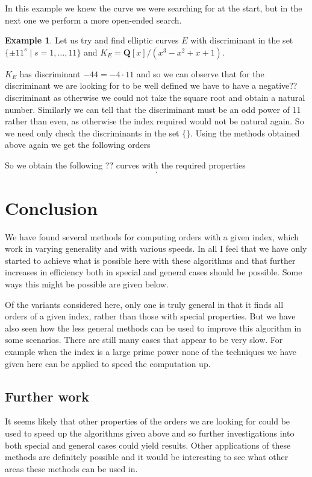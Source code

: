 \documentclass[12pt,a4paper,abstracton,bibtotoc]{scrreprt}
\theoremstyle{definition}
\newtheorem{ex}{Example}
\newcommand{\QQ}{\mathbf{Q}}
\begin{document}
In this example we knew the curve we were searching for at the start, but in the next one we perform a more open-ended search.

\begin{ex}
Let us try and find elliptic curves $E$ with discriminant in the set $\{\pm 11^s\mid s = 1,\ldots,11\}$ and $K_E = \QQ[x]/(x^3 - x^2 + x + 1)$.

$K_E$ has discriminant $-44 = -4\cdot 11$ and so we can observe that for the discriminant we are looking for to be well defined we have to have a negative?? discriminant as otherwise we could not take the square root and obtain a natural number.
Similarly we can tell that the discriminant must be an odd power of 11 rather than even, as otherwise the index required would not be natural again.
So we need only check the discriminants in the set $\{\}$.
Using the methods obtained above again we get the following orders

So we obtain the following ?? curves with the required properties
\[
.
\]
\end{ex}

\chapter{Conclusion}
We have found several methods for computing orders with a given index, which work in varying generality and with various speeds.
In all I feel that we have only started to achieve what is possible here with these algorithms and that further increases in efficiency both in special and general cases should be possible.
Some ways this might be possible are given below.

Of the variants considered here, only one is truly general in that it finds all orders of a given index, rather than those with special properties.
But we have also seen how the less general methods can be used to improve this algorithm in some scenarios.
There are still many cases that appear to be very slow.
For example when the index is a large prime power none of the techniques we have given here can be applied to speed the computation up.


\section{Further work}
It seems likely that other properties of the orders we are looking for could be used to speed up the algorithms given above and so further investigations into both special and general cases could yield results.
Other applications of these methods are definitely possible and it would be interesting to see what other areas these methods can be used in.
\end{document}
